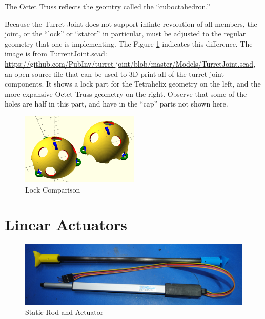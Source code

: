 \documentclass[11pt]{article}
\begin{document}
The Octet Truss reflects the geomtry called the ``cuboctahedron.''

Because the Turret Joint does not support infinte revolution of all members, the joint, or the ``lock'' or ``stator'' in particular,
must be adjusted to the regular geometry that one is implementing.  The Figure \ref{lockcomparison} indicates this difference.
The image is from TurrentJoint.scad:\\
\href{https://github.com/PubInv/turret-joint/blob/master/Models/TurretJoint.scad}{https://github.com/PubInv/turret-joint/blob/master/Models/TurretJoint.scad}, an
open-source file that can be used to 3D print all of the turret joint components.
It shows a lock part for the Tetrahelix geometry
on the left, and the more expansive Octet Truss geometry on the right. Observe that some of the holes are half in this part,
and have in the ``cap'' parts not shown here.

\begin{figure}[!ht]
  \centering
    \includegraphics[width=0.5\textwidth]{TetrahelixLockVsOctetTrussLock.png}
    \caption[Lock Comparison]{Lock Comparison}
      \label{lockcomparison}
\end{figure}





\section{Linear Actuators}
\label{linearactuators}

\begin{figure}[!ht]
  \centering
    \includegraphics[width=1.0\textwidth]{CarbonFiberAndActuator.jpg}
    \caption[Static Rod and Actuator]{Static Rod and Actuator}
      \label{rodAndActuator}
\end{figure}
\end{document}

